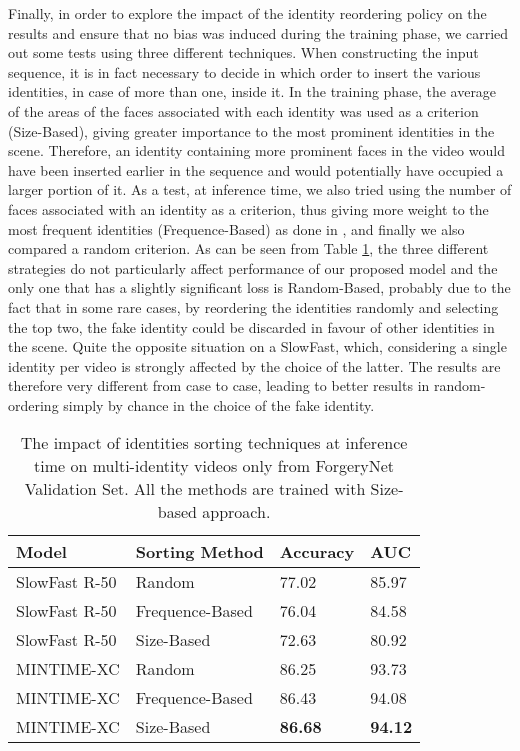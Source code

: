 \documentclass[10pt,twocolumn,letterpaper]{article}
\begin{document}
Finally, in order to explore the impact of the identity reordering policy on the results and ensure that no bias was induced during the training phase, we carried out some tests using three different techniques. When constructing the input sequence, it is in fact necessary to decide in which order to insert the various identities, in case of more than one, inside it. In the training phase, the average of the areas of the faces associated with each identity was used as a criterion (Size-Based), giving greater importance to the most prominent identities in the scene. Therefore, an identity containing more prominent faces in the video would have been inserted earlier in the sequence and would potentially have occupied a larger portion of it. As a test, at inference time, we also tried using the number of faces associated with an identity as a criterion, thus giving more weight to the most frequent identities (Frequence-Based) as done in \cite{forgerynet}, and finally we also compared a random criterion.
As can be seen from Table \ref{tab:ordering}, the three different strategies do not particularly affect performance of our proposed model and the only one that has a slightly significant loss is Random-Based, probably due to the fact that in some rare cases, by reordering the identities randomly and selecting the top two, the fake identity could be discarded in favour of other identities in the scene. Quite the opposite situation on a SlowFast, which, considering a single identity per video is strongly affected by the choice of the latter. The results are therefore very different from case to case, leading to better results in random-ordering simply by chance in the choice of the fake identity.

\begin{table}
    \centering
    \begin{tabular}{llll}
    \hline
        Model & Sorting Method & Accuracy & AUC \\ \hline
        SlowFast R-50 & Random & 77.02 & 85.97 \\
        SlowFast R-50 & Frequence-Based & 76.04 & 84.58 \\
        SlowFast R-50 & Size-Based & 72.63 & 80.92 \\
        MINTIME-XC & Random & 86.25 & 93.73 \\
        MINTIME-XC & Frequence-Based & 86.43 & 94.08 \\
        MINTIME-XC & Size-Based & \textbf{86.68} & \textbf{94.12} \\ \hline
    \end{tabular}
    \caption{The impact of identities sorting techniques at inference time on multi-identity videos only from ForgeryNet Validation Set. All the methods are trained with Size-based approach.}
    \label{tab:ordering}
\end{table}
\end{document}
